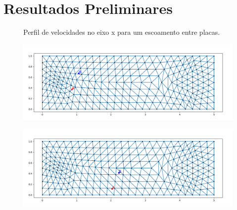 \documentclass{beamer}
\begin{document}
\section{Resultados Preliminares}

\begin{frame}
  \begin{figure}
     {\raggedleft \tiny Perfil de velocidades no eixo x para um escoamento entre placas.}
  \end{figure}
  
  \begin{minipage}{.49\textwidth}
    \begin{figure}
      \includegraphics[width=\linewidth]{figure/particles_results_1.png}
    \end{figure}
  \end{minipage}
  \begin{minipage}{.49\textwidth}
    \begin{figure}
      \includegraphics[width=\linewidth]{figure/particles_results_3.png}
    \end{figure}
  \end{minipage}
  
\end{frame}
\end{document}
